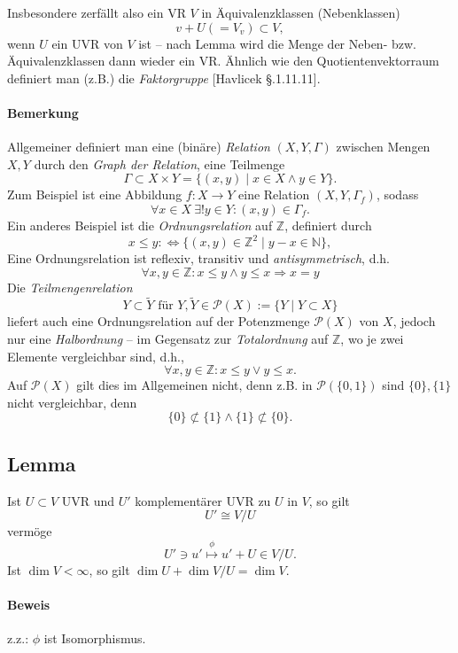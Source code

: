  	Insbesondere zerfällt also ein VR $ V $ in Äquivalenzklassen (Nebenklassen)
 	\[
 		v+U (= V_v)\subset V,
 	\]
 	wenn $ U $ ein UVR von $ V $ ist -- nach Lemma wird die Menge der Neben- bzw. Äquivalenzklassen dann wieder ein VR. Ähnlich wie den Quotientenvektorraum definiert man (z.B.) die \emph{Faktorgruppe} [Havlicek §.1.11.11].

 	\paragraph{Bemerkung}
 		Allgemeiner definiert man eine (binäre) \emph{Relation} $ (X,Y,\Gamma) $ zwischen Mengen $ X, Y $ durch den \emph{Graph der Relation}, eine Teilmenge
 		\[
 			\Gamma \subset X\times Y = \{(x,y)\mid x\in X \land y\in Y\}.
 		\]
 		Zum Beispiel ist eine Abbildung $ f:X\to Y $ eine Relation $ (X,Y,\Gamma_f) $, sodass
 		\[
 			\forall x\in X\ \exists ! y\in Y:(x,y)\in \Gamma_f.
 		\]
 		Ein anderes Beispiel ist die \emph{Ordnungsrelation} auf $ \mathbb{Z} $, definiert durch
 		\[
 			x\leq y :\Leftrightarrow \{(x,y)\in \mathbb{Z}^2\mid y-x\in \mathbb{N}\},
 		\]
 		Eine Ordnungsrelation ist reflexiv, transitiv und \emph{antisymmetrisch}, d.h.
 		\[
 			\forall x,y\in \mathbb{Z}: x\leq y\land y\leq x\Rightarrow x=y
 		\]
 		Die \emph{Teilmengenrelation}
 		\[
 			Y\subset\tilde{Y} \text{ für } Y,\tilde{Y}\in \mathcal{P}(X):= \{Y\mid Y\subset X\}
 		\]
 		liefert auch eine Ordnungsrelation auf der Potenzmenge $ \mathcal{P}(X) $ von $ X $, jedoch nur eine \emph{Halbordnung} -- im Gegensatz zur \emph{Totalordnung} auf $ \mathbb{Z} $, wo je zwei Elemente vergleichbar sind, d.h.,
 		\[
 			\forall x,y\in \mathbb{Z}: x\leq y\lor y\leq x.
 		\]
 		Auf $ \mathcal{P}(X) $ gilt dies im Allgemeinen nicht, denn z.B. in $ \mathcal{P}(\{0,1\}) $ sind $ \{0\},\{1\} $ nicht vergleichbar, denn
 		\[
 			\{0\}\not\subset\{1\}\land \{1\}\not\subset \{0\}.
 		\]

 \subsection{Lemma}
 	\begin{Lemma}
 		Ist $ U\subset V $ UVR und $ U' $ komplementärer UVR zu $ U $ in $ V $, so gilt
 		\[
 			U'\cong V/U
 		\]
 		vermöge
 		\[
 			U'\ni u' \overset{\phi}{\mapsto} u'+U\in V/U.
 		\]
 		Ist $ \dim V<\infty $, so gilt $ \dim U+\dim V/U = \dim V $.
 	\end{Lemma}

 	\paragraph{Beweis} z.z.: $ \phi $ ist Isomorphismus.

